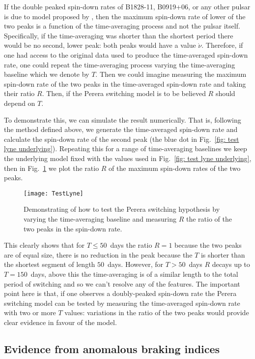 If the double peaked spin-down rates of B1828-11, B0919+06, or any other pulsar
is due to model proposed by \citet{Perera2014}, then the maximum spin-down rate
of lower of the two peaks is a function of the time-averaging process and not
the pulsar itself.  Specifically, if the time-averaging was shorter than the
shortest period there would be no second, lower peak: both peaks would have a
value $\dot{\nu}$.  Therefore, if one had access to the original data used to
produce the time-averaged spin-down rate, one could repeat the time-averaging
process varying the time-averaging baseline which we denote by $T$. Then we
could imagine measuring the maximum spin-down rate of the two peaks in the
time-averaged spin-down rate and taking their ratio $R$. Then, if the Perera
switching model is to be believed $R$ should depend on $T$.

To demonstrate this, we can simulate the result numerically. That is, following
the method defined above, we generate the time-averaged spin-down rate and
calculate the spin-down rate of the second peak (the blue dot in Fig.~\ref{fig:
test lyne underlying}). Repeating this for a range of time-averaging baselines
we keep the underlying model fixed with the values used in Fig.~\ref{fig: test
lyne underlying}, then in Fig.~\ref{fig: test lyne} we plot the ratio $R$ of
the maximum spin-down rates of the two peaks.
\begin{figure}[htb]
    \centering
    \texttt{[image: TestLyne]}
    \caption{Demonstrating of how to test the Perera switching hypothesis
             by varying the time-averaging baseline and measuring $R$ the ratio
             of the two peaks in the spin-down rate.}
    \label{fig: test lyne}
\end{figure}
This clearly shows that for $T\le50$~days the ratio $R=1$ because the two peaks
are of equal size, there is no reduction in the peak because the $T$ is shorter
than the shortest segment of length $50$~days. However, for $T>50$~days $R$
decays up to $T=150$~days, above this the time-averaging is of a similar length
to the total period of switching and so we can't resolve any of the features.
The important point here is that, if one observes a doubly-peaked spin-down
rate the Perera switching model can be tested by measuring the time-averaged
spin-down rate with two or more $T$ values: variations in the ratio of the
two peaks would provide clear evidence in favour of the model.


\subsection{Evidence from anomalous braking indices}
\label{sec: evidence from anomalous braking indices}

